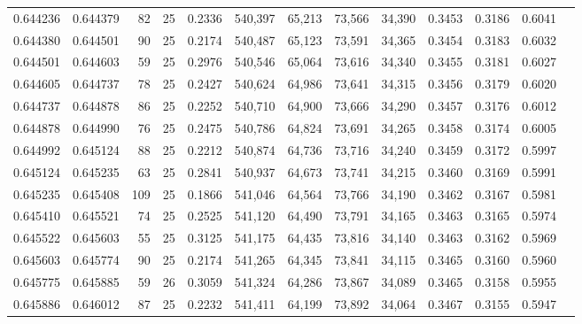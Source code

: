 \begin{tabular}{rrrrrrrrrrrrr}
0.644236 & 0.644379 &    82 &  25 &                                     0.2336 & 540,397 &  65,213 &  73,566 &  34,390 & 0.3453 & 0.3186 & 0.6041 \\
0.644380 & 0.644501 &    90 &  25 &                                     0.2174 & 540,487 &  65,123 &  73,591 &  34,365 & 0.3454 & 0.3183 & 0.6032 \\
0.644501 & 0.644603 &    59 &  25 &                                     0.2976 & 540,546 &  65,064 &  73,616 &  34,340 & 0.3455 & 0.3181 & 0.6027 \\
0.644605 & 0.644737 &    78 &  25 &                                     0.2427 & 540,624 &  64,986 &  73,641 &  34,315 & 0.3456 & 0.3179 & 0.6020 \\
0.644737 & 0.644878 &    86 &  25 &                                     0.2252 & 540,710 &  64,900 &  73,666 &  34,290 & 0.3457 & 0.3176 & 0.6012 \\
0.644878 & 0.644990 &    76 &  25 &                                     0.2475 & 540,786 &  64,824 &  73,691 &  34,265 & 0.3458 & 0.3174 & 0.6005 \\
0.644992 & 0.645124 &    88 &  25 &                                     0.2212 & 540,874 &  64,736 &  73,716 &  34,240 & 0.3459 & 0.3172 & 0.5997 \\
0.645124 & 0.645235 &    63 &  25 &                                     0.2841 & 540,937 &  64,673 &  73,741 &  34,215 & 0.3460 & 0.3169 & 0.5991 \\
0.645235 & 0.645408 &   109 &  25 &                                     0.1866 & 541,046 &  64,564 &  73,766 &  34,190 & 0.3462 & 0.3167 & 0.5981 \\
0.645410 & 0.645521 &    74 &  25 &                                     0.2525 & 541,120 &  64,490 &  73,791 &  34,165 & 0.3463 & 0.3165 & 0.5974 \\
0.645522 & 0.645603 &    55 &  25 &                                     0.3125 & 541,175 &  64,435 &  73,816 &  34,140 & 0.3463 & 0.3162 & 0.5969 \\
0.645603 & 0.645774 &    90 &  25 &                                     0.2174 & 541,265 &  64,345 &  73,841 &  34,115 & 0.3465 & 0.3160 & 0.5960 \\
0.645775 & 0.645885 &    59 &  26 &                                     0.3059 & 541,324 &  64,286 &  73,867 &  34,089 & 0.3465 & 0.3158 & 0.5955 \\
0.645886 & 0.646012 &    87 &  25 &                                     0.2232 & 541,411 &  64,199 &  73,892 &  34,064 & 0.3467 & 0.3155 & 0.5947 \\

\end{tabular}
